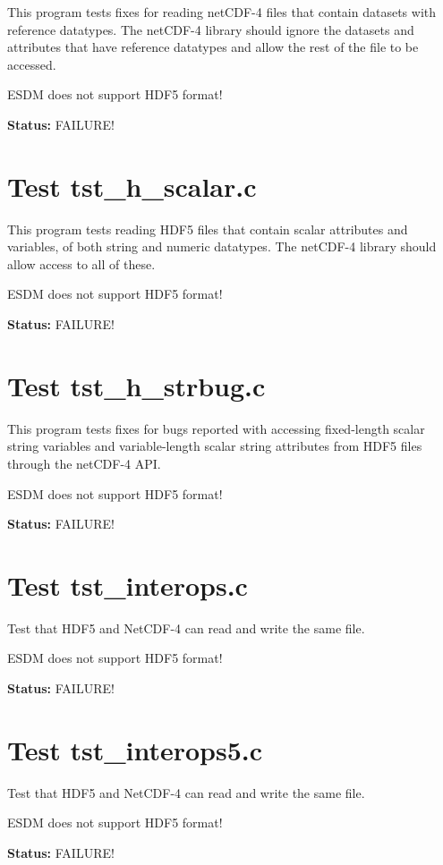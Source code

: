 This program tests fixes for reading netCDF-4 files that contain datasets with reference datatypes.  The netCDF-4 library should ignore the datasets and attributes that have reference datatypes and allow the rest of the file to be accessed.

ESDM does not support HDF5 format!

{\bf \large Status: } FAILURE!

\section{Test tst\_h\_scalar.c}

This program tests reading HDF5 files that contain scalar attributes and variables, of both string and numeric datatypes.  The netCDF-4 library should allow access to all of these.

ESDM does not support HDF5 format!

{\bf \large Status: } FAILURE!

\section{Test tst\_h\_strbug.c}

This program tests fixes for bugs reported with accessing fixed-length scalar string variables and variable-length scalar string attributes from HDF5 files through the netCDF-4 API.

ESDM does not support HDF5 format!

{\bf \large Status: } FAILURE!

\section{Test tst\_interops.c}

Test that HDF5 and NetCDF-4 can read and write the same file.

ESDM does not support HDF5 format!

{\bf \large Status: } FAILURE!

\section{Test tst\_interops5.c}

Test that HDF5 and NetCDF-4 can read and write the same file.

ESDM does not support HDF5 format!

{\bf \large Status: } FAILURE!

